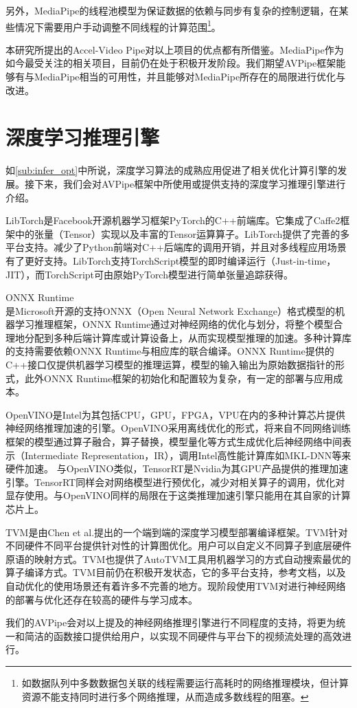 另外，MediaPipe的线程池模型为保证数据的依赖与同步有复杂的控制逻辑，在某些情况下需要用户手动调整不同线程的计算范围\footnote{如数据队列中多数数据包关联的线程需要运行高耗时的网络推理模块，但计算资源不能支持同时进行多个网络推理，从而造成多数线程的阻塞。}。\par
本研究所提出的Accel-Video Pipe对以上项目的优点都有所借鉴。MediaPipe作为如今最受关注的相关项目，目前仍在处于积极开发阶段。我们期望AVPipe框架能够有与MediaPipe相当的可用性，并且能够对MediaPipe所存在的局限进行优化与改进。\par

\section{深度学习推理引擎}\label{related:dl_engine}
如\ref{sub:infer_opt}中所说，深度学习算法的成熟应用促进了相关优化计算引擎的发展。接下来，我们会对AVPipe框架中所使用或提供支持的深度学习推理引擎进行介绍。\par
LibTorch是Facebook开源机器学习框架PyTorch\cite{paszke2019pytorch}的C++前端库。它集成了Caffe2\cite{markham2017caffe2}框架中的张量（Tensor）实现以及丰富的Tensor运算算子。LibTorch提供了完善的多平台支持。减少了Python前端对C++后端库的调用开销，并且对多线程应用场景有了更好支持。LibTorch支持TorchScript模型的即时编译运行（Just-in-time， JIT），而TorchScript可由原始PyTorch模型进行简单张量追踪获得。\par
ONNX Runtime\cite{onnxruntime}是Microsoft开源的支持ONNX（Open Neural Network Exchange）\cite{onnx}格式模型的机器学习推理框架，ONNX Runtime通过对神经网络的优化与划分，将整个模型合理地分配到多种后端计算库或计算设备上，从而实现模型推理的加速。多种计算库的支持需要依赖ONNX  Runtime与相应库的联合编译。ONNX Runtime提供的C++接口仅提供机器学习模型的推理运算，模型的输入输出为原始数据指针的形式，此外ONNX Runtime框架的初始化和配置较为复杂，有一定的部署与应用成本。\par
OpenVINO\cite{openvino}是Intel为其包括CPU，GPU，FPGA，VPU在内的多种计算芯片提供神经网络推理加速的引擎。OpenVINO采用离线优化的形式，将来自不同网络训练框架的模型通过算子融合，算子替换，模型量化等方式生成优化后神经网络中间表示（Intermediate Representation，IR）\cite{cyphers2018intel}，调用Intel高性能计算库如MKL-DNN\cite{mkldnn}等来硬件加速。
与OpenVINO类似，TensorRT\cite{tensorrt}是Nvidia为其GPU产品提供的推理加速引擎。TensorRT同样会对网络模型进行预优化，减少对相关算子的调用，优化对显存使用。与OpenVINO同样的局限在于这类推理加速引擎只能用在其自家的计算芯片上。\par
TVM\cite{chen2018tvm}是由Chen et al.提出的一个端到端的深度学习模型部署编译框架。TVM针对不同硬件不同平台提供针对性的计算图优化。用户可以自定义不同算子到底层硬件原语的映射方式。TVM也提供了AutoTVM工具用机器学习的方式自动搜索最优的算子编译方式。TVM目前仍在积极开发状态，它的多平台支持，参考文档，以及自动优化的使用场景还有着许多不完善的地方。现阶段使用TVM对进行神经网络的部署与优化还存在较高的硬件与学习成本。\par
我们的AVPipe会对以上提及的神经网络推理引擎进行不同程度的支持，将更为统一和简洁的函数接口提供给用户，以实现不同硬件与平台下的视频流处理的高效进行。
